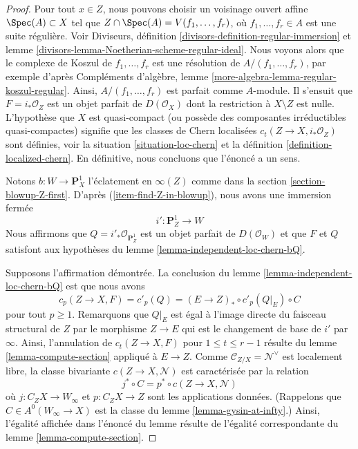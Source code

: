 \begin{proof}
Pour tout $x \in Z$, nous pouvons choisir un voisinage ouvert affine
$\Spec(A) \subset X$ tel que $Z \cap \Spec(A) = V(f_1, \ldots, f_r)$,
où $f_1, \ldots, f_r \in A$ est une suite régulière.
Voir Diviseurs, définition \ref{divisors-definition-regular-immersion} et
lemme \ref{divisors-lemma-Noetherian-scheme-regular-ideal}.
Nous voyons alors que le complexe de Koszul de $f_1, \ldots, f_r$ est
une résolution de $A/(f_1, \ldots, f_r)$, par exemple d'après
Compléments d'algèbre, lemme \ref{more-algebra-lemma-regular-koszul-regular}.
Ainsi, $A/(f_1, \ldots, f_r)$ est parfait comme $A$-module.
Il s'ensuit que $F = i_*\mathcal{O}_Z$ est un objet parfait de
$D(\mathcal{O}_X)$ dont la restriction à $X \setminus Z$ est nulle.
L'hypothèse que $X$ est quasi-compact (ou possède des composantes
irréductibles quasi-compactes) signifie que les classes de Chern localisées
$c_t(Z \to X, i_*\mathcal{O}_Z)$ sont définies, voir
la situation \ref{situation-loc-chern} et la
définition \ref{definition-localized-chern}. En définitive,
nous concluons que l'énoncé a un sens.

\medskip\noindent
Notons $b : W \to \mathbf{P}^1_X$ l'éclatement en $\infty(Z)$
comme dans la section \ref{section-blowup-Z-first}. D'après (\ref{item-find-Z-in-blowup}),
nous avons une immersion fermée
$$
i' : \mathbf{P}^1_Z \longrightarrow W
$$
Nous affirmons que $Q = i'_*\mathcal{O}_{\mathbf{P}^1_Z}$
est un objet parfait de
$D(\mathcal{O}_W)$ et que $F$ et $Q$ satisfont aux hypothèses du
lemme \ref{lemma-independent-loc-chern-bQ}.

\medskip\noindent
Supposons l'affirmation démontrée. La conclusion du lemme \ref{lemma-independent-loc-chern-bQ}
est que nous avons
$$
c_p(Z \to X, F) = c'_p(Q) = (E \to Z)_* \circ c'_p(Q|_E) \circ C
$$
pour tout $p \geq 1$. Remarquons que $Q|_E$ est égal à l'image directe du
faisceau structural de $Z$ par le morphisme $Z \to E$ qui est le
changement de base de $i'$ par $\infty$.
Ainsi, l'annulation de $c_t(Z \to X, F)$ pour $1 \leq t \leq r - 1$
résulte du lemme \ref{lemma-compute-section} appliqué à $E \to Z$.
Comme $\mathcal{C}_{Z/X} = \mathcal{N}^\vee$
est localement libre, la classe bivariante $c(Z \to X, \mathcal{N})$
est caractérisée par la relation
$$
j^* \circ C = p^* \circ c(Z \to X, \mathcal{N})
$$
où $j : C_ZX \to W_\infty$ et $p : C_ZX \to Z$ sont les applications données.
(Rappelons que $C \in A^0(W_\infty \to X)$ est la classe du
lemme \ref{lemma-gysin-at-infty}.)
Ainsi, l'égalité affichée dans l'énoncé du lemme
résulte de l'égalité correspondante du lemme \ref{lemma-compute-section}.


\end{proof}
